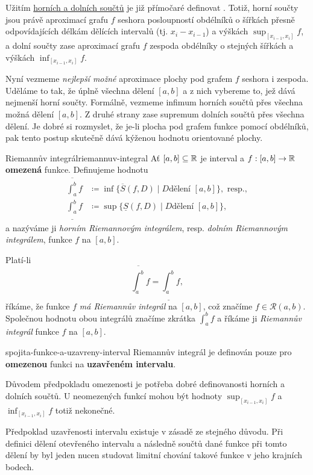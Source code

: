 Užitím \hyperref[def:horni-a-dolni-soucty]{horních a dolních součtů} je již
přímočaré definovat . Totiž, horní součty jsou právě
aproximací grafu $f$ seshora posloupností obdélníků o šířkách přesně
odpovídajících délkám dělících intervalů (tj. $x_i - x_{i-1}$) a výškách
$\sup_{[x_{i-1},x_i]} f$, a dolní součty zase aproximací grafu $f$ zespoda
obdélníky o stejných šířkách a výškách $\inf_{[x_{i-1},x_i]} f$.

Nyní vezmeme \emph{nejlepší možné} aproximace plochy pod grafem $f$ seshora i
zespoda. Uděláme to tak, že  úplně všechna dělení $[a,b]$ a z
nich vybereme to, jež dává nejmenší horní součty. Formálně, vezmeme infimum
horních součtů přes všechna možná dělení $[a,b]$. Z druhé strany zase supremum
dolních součtů přes všechna dělení. Je dobré si rozmyslet, že je-li plocha pod
grafem funkce  pomocí obdélníků, pak tento postup skutečně
dává kýženou hodnotu orientované plochy.

\begin{definition}{Riemannův integrál}{riemannuv-integral}
 Ať $[a,b] \subseteq \mathbb{R}$ je interval a $f:[a,b] \to \mathbb{R}$ \textbf{omezená} funkce.
 Definujeme hodnotu
 \begin{align*}
  \overline{\int_a^{b}} f &\coloneqq \inf \{\overline{S}(f,D) \mid D \text{
  dělení } [a,b]\}, \text{ resp.},\\
   \underline{\int_{a}^{b}} f &\coloneqq \sup \{\underline{S}(f,D) \mid D \text{
   dělení } [a,b]\},
 \end{align*}
 a nazýváme ji \emph{horním Riemannovým integrálem}, resp. \emph{dolním
 Riemannovým integrálem}, funkce $f$ na $[a,b]$.

 Platí-li
 \[
  \overline{\int_{a}^{b}} f = \underline{\int_{a}^{b}} f,
 \]
 říkáme, že funkce $f$ \emph{má Riemannův integrál} na $[a,b]$, což značíme
 $f \in \mathcal{R}(a,b)$. Společnou hodnotu obou integrálů značíme zkrátka
 $\int_{a}^{b} f$ a říkáme ji \emph{Riemannův integrál} funkce $f$ na $[a,b]$.
\end{definition}

\begin{warning}{}{spojita-funkce-a-uzavreny-interval}
 Riemannův integrál je definován pouze pro \textbf{omezenou} funkci na
 \textbf{uzavřeném intervalu}.

 Důvodem předpokladu omezenosti je potřeba dobré definovanosti horních a dolních
 součtů. U neomezených funkcí mohou být hodnoty $\sup_{[x_{i-1},x_i]} f$ a
 $\inf_{[x_{i-1},x_i]} f$ totiž nekonečné.

 Předpoklad uzavřenosti intervalu existuje v zásadě ze stejného důvodu. Při
 definici dělení otevřeného intervalu a následně součtů dané funkce při tomto
 dělení by byl jeden nucen studovat limitní chování takové funkce v jeho
 krajních bodech.
\end{warning}
